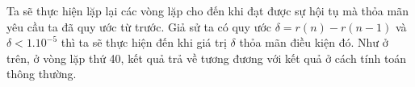 Ta sẽ thực hiện lặp lại các vòng lặp cho đến khi đạt được sự hội tụ mà thỏa mãn yêu cầu ta đã quy ước từ trước. Giả sử ta có quy ước $\delta = r(n) - r(n-1)$ và $\delta < 1.10^{-5}$ thì ta sẽ thực hiện đến khi giá trị $\delta$ thỏa mãn điều kiện đó. Như ở trên, ở vòng lặp thứ 40, kết quả trả về tương đương với kết quả ở cách tính toán thông thường.